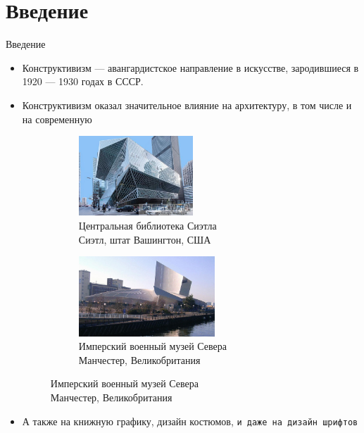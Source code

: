 \section{Введение}
\begin{frame}{Введение}
    \begin{itemize}
        \item Конструктивизм --- авангардистское направление в искусстве, зародившиеся в 1920 --- 1930 годах в СССР.
              \pause
        \item Конструктивизм оказал значительное влияние на архитектуру, в том числе и на современную
              \begin{figure}
                  \centering
                  \begin{subfigure}[b]{0.45\textwidth}
                      \centering
                      \includegraphics[height=3cm]{images/seattle.jpg}
                      \caption*{Центральная библиотека Сиэтла \\ Сиэтл, штат Вашингтон, США}
                  \end{subfigure}
                  \hfill
                  \begin{subfigure}[b]{0.45\textwidth}
                      \centering
                      \includegraphics[height=3cm]{images/iwms.jpg}
                      \caption*{Имперский военный музей Севера \\ Манчестер, Великобритания}
                  \end{subfigure}
              \end{figure}
              \pause
        \item  А также на книжную графику, дизайн костюмов,
        \texttt{и даже на дизайн шрифтов}
    \end{itemize}

\end{frame}